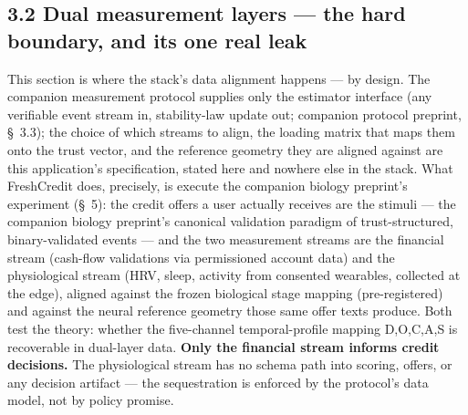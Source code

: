 \documentclass[11pt,twocolumn]{article}
\begin{document}
\subsection*{3.2 Dual measurement layers --- the hard boundary, and its one real leak}

This section is where the stack's data alignment happens --- by design. The companion measurement protocol supplies only the estimator interface (any verifiable event stream in, stability-law update out; companion protocol preprint, \S~3.3); the choice of which streams to align, the loading matrix that maps them onto the trust vector, and the reference geometry they are aligned against are this application's specification, stated here and nowhere else in the stack. What FreshCredit does, precisely, is execute the companion biology preprint's experiment (\S~5): the credit offers a user actually receives are the stimuli --- the companion biology preprint's canonical validation paradigm of trust-structured, binary-validated events --- and the two measurement streams are the financial stream (cash-flow validations via permissioned account data) and the physiological stream (HRV, sleep, activity from consented wearables, collected at the edge), aligned against the frozen biological stage mapping (pre-registered) and against the neural reference geometry those same offer texts produce. Both test the theory: whether the five-channel temporal-profile mapping D,O,C,A,S is recoverable in dual-layer data. \textbf{Only the financial stream informs credit decisions.} The physiological stream has no schema path into scoring, offers, or any decision artifact --- the sequestration is enforced by the protocol's data model, not by policy promise.
\end{document}
